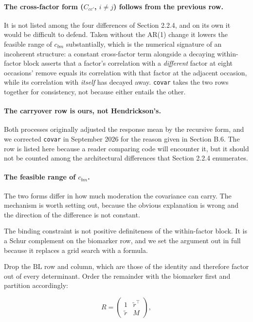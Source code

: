 \documentclass[
  11pt,
]{article}
\begin{document}
\paragraph{The cross-factor form ($C_{cc'}$, $i \neq j$) follows from
the previous row.}

It is not listed among the four differences of
Section 2.2.4, and on its own it would be difficult to defend. Taken
without the AR(1) change it lowers the feasible range of \(c_{bm}\)
substantially, which is the numerical signature of an incoherent
structure: a constant cross-factor term alongside a decaying
within-factor block asserts that a factor's correlation with a
\emph{different} factor at eight occasions' remove equals its
correlation with that factor at the adjacent occasion, while its
correlation with \emph{itself} has decayed away. \texttt{covar} takes
the two rows together for consistency, not because either entails the
other.

\paragraph{The carryover row is ours, not Hendrickson's.}

Both
processes originally adjusted the response mean by the recursive
form, and we corrected \texttt{covar} in September
2026 for the reason given in Section B.6. The row is listed here
because a reader comparing code will encounter it, but it should not
be counted among the architectural differences that Section 2.2.4
enumerates.

\paragraph{The feasible range of $c_{bm}$.}

The two forms differ in
how much moderation the covariance can carry. The mechanism is worth
setting out, because the obvious explanation is wrong and the
direction of the difference is not constant.

The binding constraint is not positive definiteness of the
within-factor block. It is a Schur complement on the biomarker row,
and we set the argument out in full because it replaces a grid search
with a formula.

Drop the \(\mathrm{BL}\) row and column, which are those of the
identity and therefore factor out of every determinant. Order the
remainder with the biomarker first and partition accordingly:

\[
R = \begin{pmatrix} 1 & \tilde r^{\top}\\ \tilde r & M \end{pmatrix},
\]
\end{document}
